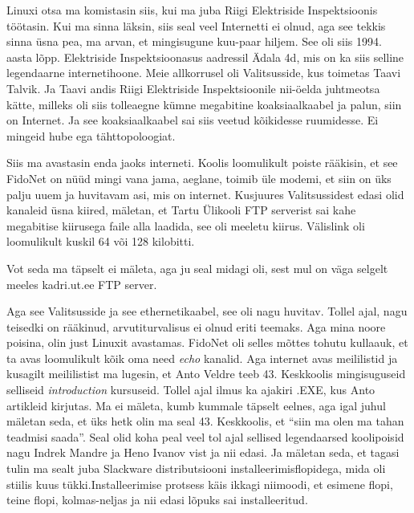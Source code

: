 
Linuxi otsa ma komistasin siis, kui ma juba Riigi Elektriside Inspektsioonis töötasin. Kui ma sinna läksin, siis seal veel Internetti ei olnud, aga see tekkis sinna üsna pea, ma arvan, et mingisugune kuu-paar hiljem. See oli siis 1994. aasta lõpp.  Elektriside Inspektsioonasus aadressil Ädala 4d, mis on ka siis selline legendaarne internetihoone.  Meie allkorrusel oli Valitsusside, kus toimetas Taavi Talvik. Ja Taavi andis Riigi Elektriside Inspektsioonile nii-öelda juhtmeotsa kätte, milleks oli siis tolleaegne kümne megabitine koaksiaalkaabel ja palun, siin on Internet. Ja  see koaksiaalkaabel sai siis veetud kõikidesse ruumidesse. Ei mingeid hube ega tähttopoloogiat.

Siis ma avastasin enda jaoks interneti. Koolis loomulikult poiste rääkisin, et see FidoNet on nüüd mingi  vana jama, aeglane, toimib üle modemi, et siin on üks palju uuem ja huvitavam asi, mis on internet. Kusjuures  Valitsussidest edasi olid kanaleid üsna kiired, mäletan, et Tartu Ülikooli FTP serverist sai kahe megabitise kiirusega faile alla laadida, see oli  meeletu kiirus. Välislink oli loomulikult kuskil 64 või 128 kilobitti. 


Vot seda ma täpselt ei mäleta, aga ju seal midagi oli, sest mul on väga selgelt meeles kadri.ut.ee  FTP server. 

Aga see Valitsusside ja see ethernetikaabel, see oli nagu huvitav. Tollel ajal, nagu teisedki on rääkinud, arvutiturvalisus ei olnud eriti teemaks. Aga mina noore poisina, olin just Linuxit avastamas. FidoNet oli selles mõttes tohutu kullaauk, et ta avas loomulikult kõik oma need \emph{echo} kanalid. Aga internet avas meililistid ja kusagilt meililistist ma lugesin, et Anto Veldre teeb 43. Keskkoolis mingisuguseid selliseid 
\emph{introduction} kursuseid. Tollel ajal ilmus ka ajakiri .EXE, kus Anto artikleid kirjutas. Ma ei mäleta, kumb kummale täpselt eelnes, aga igal juhul mäletan seda, et üks hetk olin ma seal 43. Keskkoolis, et \enquote{siin ma olen ma tahan teadmisi saada}. Seal olid koha peal veel tol ajal sellised legendaarsed koolipoisid nagu Indrek Mandre ja Heno Ivanov vist ja nii edasi. Ja mäletan seda, et tagasi tulin ma sealt juba Slackware distributsiooni installeerimisflopidega, mida oli stiilis kuus tükki.Installeerimise protsess käis ikkagi niimoodi, et esimene flopi, teine flopi, kolmas-neljas ja nii edasi lõpuks sai installeeritud. 

